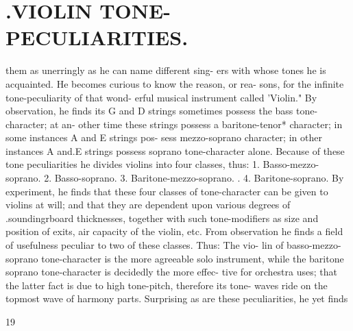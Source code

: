 \documentclass{article}
\begin{document}
\section*{.VIOLIN TONE-PECULIARITIES.}
them as unerringly as he can name different sing- ers with whose tones he is acquainted. He becomes curious to know the reason, or rea- sons, for the infinite tone-peculiarity of that wond- erful musical instrument called 'Violin." By observation, he finds its G and D strings sometimes possess the bass tone-character; at an- other time these strings possess a baritone-tenor* character; in some instances A and E strings pos- sess mezzo-soprano character; in other instances A and.E strings possess soprano tone-character alone. Because of these tone peculiarities he divides violins into four classes, thus: 1. Basso-mezzo-soprano. 2. Basso-soprano. 3. Baritone-mezzo-soprano. . 4. Baritone-soprano. By experiment, he finds that these four classes of tone-character can be given to violins at will; and that they are dependent upon various degrees of .soundingrboard thicknesses, together with such tone-modifiers as size and position of exits, air capacity of the violin, etc. From observation he finds a field of usefulness peculiar to two of these classes. Thus: The vio- lin of basso-mezzo-soprano tone-character is the more agreeable solo instrument, while the baritone soprano tone-character is decidedly the more effec- tive for orchestra uses; that the latter fact is due to high tone-pitch, therefore its tone- waves ride on the topmost wave of harmony parts. Surprising as are these peculiarities, he yet finds

19
\end{document}
